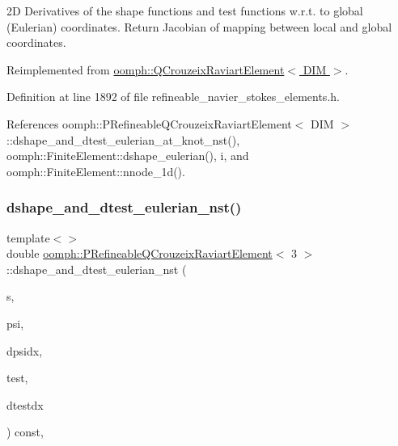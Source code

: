 2D Derivatives of the shape functions and test functions w.\+r.\+t. to global (Eulerian) coordinates. Return Jacobian of mapping between local and global coordinates. 

Reimplemented from \hyperlink{classoomph_1_1QCrouzeixRaviartElement_af1553d79bb5f49fd21f695d468ea59d4}{oomph\+::\+Q\+Crouzeix\+Raviart\+Element$<$ D\+I\+M $>$}.



Definition at line 1892 of file refineable\+\_\+navier\+\_\+stokes\+\_\+elements.\+h.



References oomph\+::\+P\+Refineable\+Q\+Crouzeix\+Raviart\+Element$<$ D\+I\+M $>$\+::dshape\+\_\+and\+\_\+dtest\+\_\+eulerian\+\_\+at\+\_\+knot\+\_\+nst(), oomph\+::\+Finite\+Element\+::dshape\+\_\+eulerian(), i, and oomph\+::\+Finite\+Element\+::nnode\+\_\+1d().

\mbox{\label{classoomph_1_1PRefineableQCrouzeixRaviartElement_adb1580b8713df0efdda70ddf47afda20}} 
\subsubsection{\texorpdfstring{dshape\+\_\+and\+\_\+dtest\+\_\+eulerian\+\_\+nst()}{dshape\_and\_dtest\_eulerian\_nst()}\hspace{0.1cm}{\footnotesize\ttfamily [3/3]}}
{\footnotesize\ttfamily template$<$$>$ \\
double \hyperlink{classoomph_1_1PRefineableQCrouzeixRaviartElement}{oomph\+::\+P\+Refineable\+Q\+Crouzeix\+Raviart\+Element}$<$ 3 $>$\+::dshape\+\_\+and\+\_\+dtest\+\_\+eulerian\+\_\+nst (\begin{DoxyParamCaption}\item[{const \hyperlink{classoomph_1_1Vector}{Vector}$<$ double $>$ \&}]{s,  }\item[{\hyperlink{classoomph_1_1Shape}{Shape} \&}]{psi,  }\item[{\hyperlink{classoomph_1_1DShape}{D\+Shape} \&}]{dpsidx,  }\item[{\hyperlink{classoomph_1_1Shape}{Shape} \&}]{test,  }\item[{\hyperlink{classoomph_1_1DShape}{D\+Shape} \&}]{dtestdx }\end{DoxyParamCaption}) const\hspace{0.3cm}{\ttfamily [inline]}, {\ttfamily [virtual]}}

